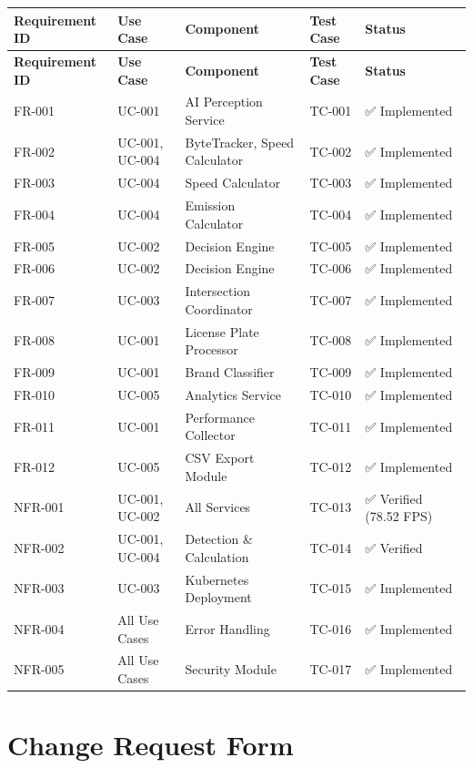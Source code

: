 \documentclass[12pt,a4paper]{article}
\begin{document}
\begin{longtable}{|p{2cm}|p{3cm}|p{3cm}|p{3cm}|p{3cm}|}
\hline
\textbf{Requirement ID} & \textbf{Use Case} & \textbf{Component} & \textbf{Test Case} & \textbf{Status} \\
\hline
\endfirsthead
\hline
\textbf{Requirement ID} & \textbf{Use Case} & \textbf{Component} & \textbf{Test Case} & \textbf{Status} \\
\hline
\endhead
FR-001 & UC-001 & AI Perception Service & TC-001 & ✅ Implemented \\
FR-002 & UC-001, UC-004 & ByteTracker, Speed Calculator & TC-002 & ✅ Implemented \\
FR-003 & UC-004 & Speed Calculator & TC-003 & ✅ Implemented \\
FR-004 & UC-004 & Emission Calculator & TC-004 & ✅ Implemented \\
FR-005 & UC-002 & Decision Engine & TC-005 & ✅ Implemented \\
FR-006 & UC-002 & Decision Engine & TC-006 & ✅ Implemented \\
FR-007 & UC-003 & Intersection Coordinator & TC-007 & ✅ Implemented \\
FR-008 & UC-001 & License Plate Processor & TC-008 & ✅ Implemented \\
FR-009 & UC-001 & Brand Classifier & TC-009 & ✅ Implemented \\
FR-010 & UC-005 & Analytics Service & TC-010 & ✅ Implemented \\
FR-011 & UC-001 & Performance Collector & TC-011 & ✅ Implemented \\
FR-012 & UC-005 & CSV Export Module & TC-012 & ✅ Implemented \\
NFR-001 & UC-001, UC-002 & All Services & TC-013 & ✅ Verified (78.52 FPS) \\
NFR-002 & UC-001, UC-004 & Detection \& Calculation & TC-014 & ✅ Verified \\
NFR-003 & UC-003 & Kubernetes Deployment & TC-015 & ✅ Implemented \\
NFR-004 & All Use Cases & Error Handling & TC-016 & ✅ Implemented \\
NFR-005 & All Use Cases & Security Module & TC-017 & ✅ Implemented \\
\hline
\end{longtable}

\section{Change Request Form}
\end{document}
